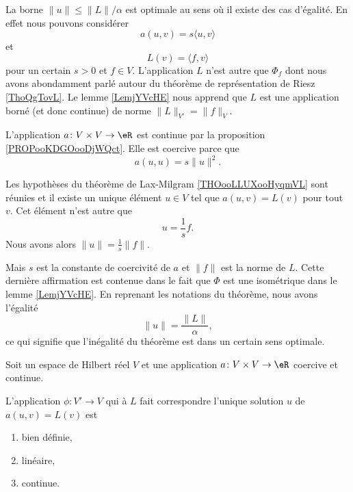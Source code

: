 \begin{example}      \label{EXooTTBDooUNhBOc}
    La borne \( \| u \|\leq \| L \|/\alpha\) est optimale au sens où il existe des cas d'égalité. En effet nous pouvons considérer
    \begin{equation}
        a(u,v)=s\langle u, v\rangle 
    \end{equation}
    et
    \begin{equation}
        L(v)=\langle f, v\rangle 
    \end{equation}
    pour un certain \( s>0\) et \( f\in V\). L'application \( L\) n'est autre que \( \Phi_f\) dont nous avons abondamment parlé autour du théorème de représentation de Riesz \ref{ThoQgTovL}. Le lemme \ref{LemjYVcHE} nous apprend que \( L\) est une application borné (et donc continue) de norme \( \| L \|_{V'}=\| f \|_V\).

    L'application \( a\colon V\times V\to \eR\) est continue par la proposition \ref{PROPooKDGOooDjWQct}. Elle est coercive parce que
    \begin{equation}
        a(u,u)=s\| u \|^2.
    \end{equation}
   
    Les hypothèses du théorème de Lax-Milgram \ref{THOooLLUXooHyqmVL} sont réunies et il existe un unique élément \(u\in V\) tel que \( a(u,v)=L(v)\) pour tout \( v\). Cet élément n'est autre que
    \begin{equation}
        u=\frac{1}{ s }f.
    \end{equation}
    Nous avons alors \( \| u \|=\frac{1}{ s }\| f \|\).

    Mais \( s\) est la constante de coercivité de \( a\) et \( \| f \|\) est la norme de \( L\). Cette dernière affirmation est contenue dans le fait que \( \Phi\) est une isométrique dans le lemme \ref{LemjYVcHE}. En reprenant les notations du théorème, nous avons l'égalité
    \begin{equation}
        \| u \|=\frac{ \| L \| }{ \alpha },
    \end{equation}
    ce qui signifie que l'inégalité du théorème est dans un certain sens optimale.
\end{example}

\begin{proposition} \label{PROPooFEOZooTNPcBJ}
    Soit un espace de Hilbert réel \( V\) et une application \( a\colon V\times V\to \eR\) coercive et continue.

    L'application \( \phi\colon V'\to V\) qui à \( L\) fait correspondre l'unique solution \( u\) de \( a(u,v)=L(v)\) est 
    \begin{enumerate}
        \item
            bien définie,
        \item
            linéaire,
        \item
            continue.
    \end{enumerate}
\end{proposition}


